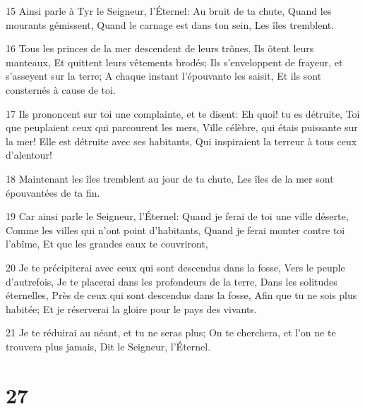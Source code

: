 \par 15 Ainsi parle à Tyr le Seigneur, l'Éternel: Au bruit de ta chute, Quand les mourants gémissent, Quand le carnage est dans ton sein, Les îles tremblent.
\par 16 Tous les princes de la mer descendent de leurs trônes, Ils ôtent leurs manteaux, Et quittent leurs vêtements brodés; Ils s'enveloppent de frayeur, et s'asseyent sur la terre; A chaque instant l'épouvante les saisit, Et ils sont consternés à cause de toi.
\par 17 Ils prononcent sur toi une complainte, et te disent: Eh quoi! tu es détruite, Toi que peuplaient ceux qui parcourent les mers, Ville célèbre, qui étais puissante sur la mer! Elle est détruite avec ses habitants, Qui inspiraient la terreur à tous ceux d'alentour!
\par 18 Maintenant les îles tremblent au jour de ta chute, Les îles de la mer sont épouvantées de ta fin.
\par 19 Car ainsi parle le Seigneur, l'Éternel: Quand je ferai de toi une ville déserte, Comme les villes qui n'ont point d'habitants, Quand je ferai monter contre toi l'abîme, Et que les grandes eaux te couvriront,
\par 20 Je te précipiterai avec ceux qui sont descendus dans la fosse, Vers le peuple d'autrefois, Je te placerai dans les profondeurs de la terre, Dans les solitudes éternelles, Près de ceux qui sont descendus dans la fosse, Afin que tu ne sois plus habitée; Et je réserverai la gloire pour le pays des vivants.
\par 21 Je te réduirai au néant, et tu ne seras plus; On te cherchera, et l'on ne te trouvera plus jamais, Dit le Seigneur, l'Éternel.

\chapter{27}

